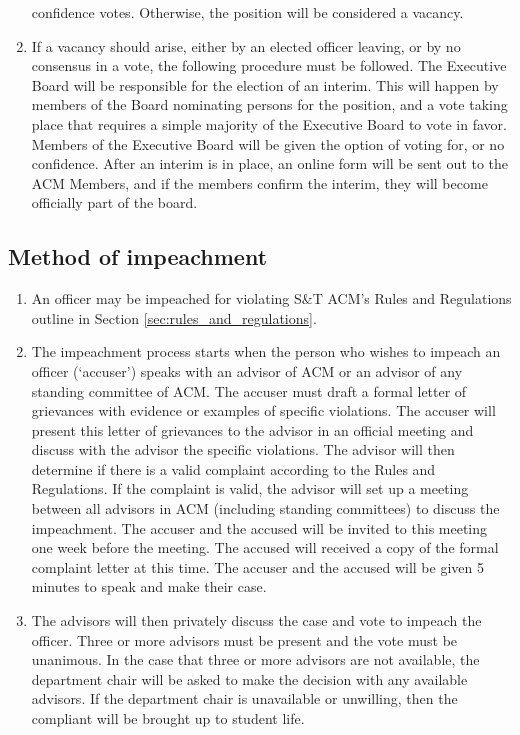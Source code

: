 \begin{enumerate}[label=\arabic*.]
      confidence votes. Otherwise, the position will be considered a vacancy.
      \item If a vacancy should arise, either by an elected officer leaving, or
      by no consensus in a vote, the following procedure must be followed. The
      Executive Board will be responsible for the election of an interim. This
      will happen by members of the Board nominating persons for the position,
      and a vote taking place that requires a simple majority of the Executive
      Board to vote in favor. Members of the Executive Board will be given the
      option of voting for, or no confidence. After an interim is in place, an
      online form will be sent out to the ACM Members, and if the members
      confirm the interim, they will become officially part of the board.
    \end{enumerate}
  \subsection{Method of impeachment} \label{sec:officer_impeachment}
    \begin{enumerate}[label=\arabic*.]
      \item An officer may be impeached for violating S\&T ACM's Rules and
        Regulations outline in Section \ref{sec:rules_and_regulations}.
      \item The impeachment process starts when the person who wishes to impeach
        an officer (`accuser') speaks with an advisor of ACM or an advisor of
        any standing committee of ACM. The accuser must draft a formal letter of
        grievances with evidence or examples of specific violations. The accuser will
        present this letter of grievances to the advisor in an official meeting
        and discuss with the advisor the specific violations. The advisor will
        then determine if there is a valid complaint according to the Rules and
        Regulations. If the complaint is valid, the advisor will set up a
        meeting between all advisors in ACM (including standing committees) to
        discuss the impeachment. The accuser and the accused will be invited to
        this meeting one week before the meeting. The accused will received a
        copy of the formal complaint letter at this time. The accuser and the
        accused will be given 5 minutes to speak and make their case.
      \item The advisors will then privately discuss the case and vote to
        impeach the officer. Three or more advisors must be present and the vote
        must be unanimous. In the case that three or more advisors are not
        available, the department chair will be asked to make the decision with
        any available advisors. If the department chair is unavailable or
        unwilling, then the compliant will be brought up to student life.
    \end{enumerate}
